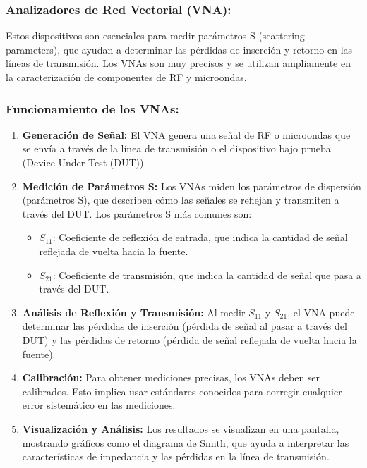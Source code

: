         \subsubsection{Analizadores de Red Vectorial (VNA):}

        Estos dispositivos son esenciales para medir parámetros S (scattering parameters), que ayudan a determinar las pérdidas de inserción y retorno en las líneas de transmisión. Los VNAs son muy precisos y se utilizan ampliamente en la caracterización de componentes de RF y microondas.
        
        \subsubsection*{Funcionamiento de los VNAs:}
            
            \begin{enumerate}
            
                \item \textbf{Generación de Señal:} El VNA genera una señal de RF o microondas que se envía a través de la línea de transmisión o el dispositivo bajo prueba (Device Under Test (DUT)).
            
                \item \textbf{Medición de Parámetros S:} Los VNAs miden los parámetros de dispersión (parámetros S), que describen cómo las señales se reflejan y transmiten a través del DUT. Los parámetros S más comunes son:
            
                \begin{itemize}
                    \item $S_{11}$: Coeficiente de reflexión de entrada, que indica la cantidad de señal reflejada de vuelta hacia la fuente.
                    \item $S_{21}$: Coeficiente de transmisión, que indica la cantidad de señal que pasa a través del DUT.
                \end{itemize}
            
                \item \textbf{Análisis de Reflexión y Transmisión:} Al medir $S_{11}$ y $S_{21}$, el VNA puede determinar las pérdidas de inserción (pérdida de señal al pasar a través del DUT) y las pérdidas de retorno (pérdida de señal reflejada de vuelta hacia la fuente).
            
                \item \textbf{Calibración:} Para obtener mediciones precisas, los VNAs deben ser calibrados. Esto implica usar estándares conocidos para corregir cualquier error sistemático en las mediciones.
            
                \item \textbf{Visualización y Análisis:} Los resultados se visualizan en una pantalla, mostrando gráficos como el diagrama de Smith, que ayuda a interpretar las características de impedancia y las pérdidas en la línea de transmisión.
            \end{enumerate}

